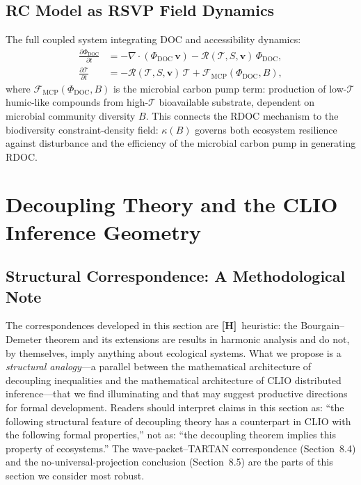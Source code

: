 \documentclass[12pt]{article}
\newcommand{\Tcal}{\mathcal{T}}
\begin{document}
\subsection{RC Model as RSVP Field Dynamics}

The full coupled system integrating DOC and accessibility dynamics:
\begin{align}
\frac{\partial\Phi_\text{DOC}}{\partial t}
&= -\nabla\cdot(\Phi_\text{DOC}\,\mathbf{v})
   - \mathcal{R}(\Tcal,S,\mathbf{v})\,\Phi_\text{DOC},\\[4pt]
\frac{\partial\Tcal}{\partial t}
&= -\mathcal{R}(\Tcal,S,\mathbf{v})\,\Tcal
   + \mathcal{F}_\text{MCP}(\Phi_\text{DOC},B),
\end{align}
where $\mathcal{F}_\text{MCP}(\Phi_\text{DOC},B)$ is the microbial carbon pump term:
production of low-$\Tcal$ humic-like compounds from high-$\Tcal$ bioavailable substrate,
dependent on microbial community diversity $B$. This connects the RDOC mechanism to
the biodiversity constraint-density field: $\kappa(B)$ governs both ecosystem resilience
against disturbance and the efficiency of the microbial carbon pump in generating RDOC.

\section{Decoupling Theory and the CLIO Inference Geometry}

\subsection{Structural Correspondence: A Methodological Note}

The correspondences developed in this section are \textbf{[H]}~heuristic: the Bourgain--Demeter
theorem and its extensions are results in harmonic analysis and do not, by themselves, imply
anything about ecological systems. What we propose is a \emph{structural analogy}---a parallel
between the mathematical architecture of decoupling inequalities and the mathematical
architecture of CLIO distributed inference---that we find illuminating and that may suggest
productive directions for formal development. Readers should interpret claims in this section
as: ``the following structural feature of decoupling theory has a counterpart in CLIO with
the following formal properties,'' not as: ``the decoupling theorem implies this property of
ecosystems.'' The wave-packet--TARTAN correspondence (Section~8.4) and the no-universal-projection
conclusion (Section~8.5) are the parts of this section we consider most robust.
\end{document}
